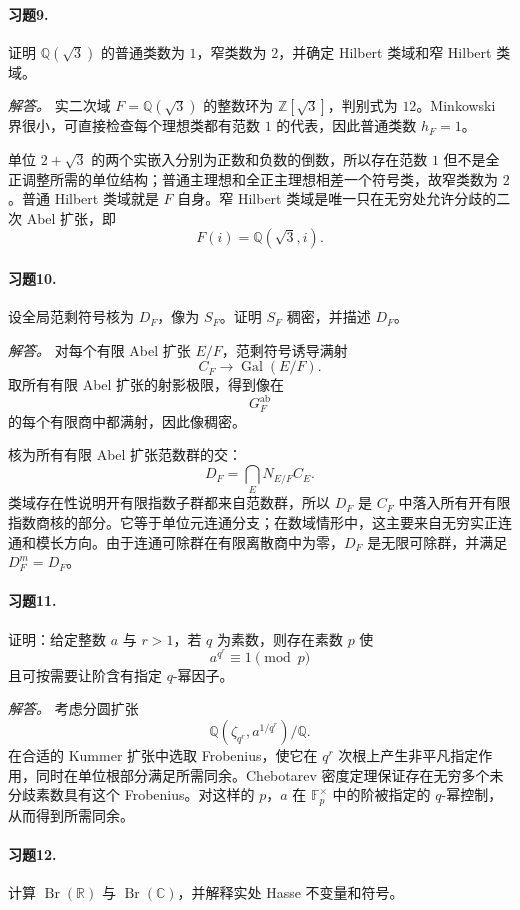 \documentclass[11pt,a4paper,openany]{ctexbook}
\numberwithin{equation}{chapter}
\newcommand{\Q}{\mathbb{Q}}
\newcommand{\R}{\mathbb{R}}
\newcommand{\C}{\mathbb{C}}
\newcommand{\Z}{\mathbb{Z}}
\newcommand{\F}{\mathbb{F}}
\newcommand{\Gal}{\operatorname{Gal}}
\newcommand{\Br}{\operatorname{Br}}
\theoremstyle{plain}
\theoremstyle{definition}
\theoremstyle{remark}
\begin{document}
\paragraph{习题9.}
证明 $\Q(\sqrt3)$ 的普通类数为 $1$，窄类数为 $2$，并确定 Hilbert 类域和窄 Hilbert 类域。

\emph{解答。}
实二次域 $F=\Q(\sqrt3)$ 的整数环为 $\Z[\sqrt3]$，判别式为 $12$。Minkowski 界很小，可直接检查每个理想类都有范数 $1$ 的代表，因此普通类数 $h_F=1$。

单位 $2+\sqrt3$ 的两个实嵌入分别为正数和负数的倒数，所以存在范数 $1$ 但不是全正调整所需的单位结构；普通主理想和全正主理想相差一个符号类，故窄类数为 $2$。普通 Hilbert 类域就是 $F$ 自身。窄 Hilbert 类域是唯一只在无穷处允许分歧的二次 Abel 扩张，即
\[
F(i)=\Q(\sqrt3,i).
\]

\paragraph{习题10.}
设全局范剩符号核为 $D_F$，像为 $S_F$。证明 $S_F$ 稠密，并描述 $D_F$。

\emph{解答。}
对每个有限 Abel 扩张 $E/F$，范剩符号诱导满射
\[
C_F\to\Gal(E/F).
\]
取所有有限 Abel 扩张的射影极限，得到像在
\[
G_F^{\operatorname{ab}}
\]
的每个有限商中都满射，因此像稠密。

核为所有有限 Abel 扩张范数群的交：
\[
D_F=\bigcap_E N_{E/F}C_E.
\]
类域存在性说明开有限指数子群都来自范数群，所以 $D_F$ 是 $C_F$ 中落入所有开有限指数商核的部分。它等于单位元连通分支；在数域情形中，这主要来自无穷实正连通和模长方向。由于连通可除群在有限离散商中为零，$D_F$ 是无限可除群，并满足 $D_F^m=D_F$。

\paragraph{习题11.}
证明：给定整数 $a$ 与 $r>1$，若 $q$ 为素数，则存在素数 $p$ 使
\[
a^{q^r}\equiv1\pmod p
\]
且可按需要让阶含有指定 $q$-幂因子。

\emph{解答。}
考虑分圆扩张
\[
\Q(\zeta_{q^r},a^{1/q^r})/\Q.
\]
在合适的 Kummer 扩张中选取 Frobenius，使它在 $q^r$ 次根上产生非平凡指定作用，同时在单位根部分满足所需同余。Chebotarev 密度定理保证存在无穷多个未分歧素数具有这个 Frobenius。对这样的 $p$，$a$ 在 $\F_p^\times$ 中的阶被指定的 $q$-幂控制，从而得到所需同余。

\paragraph{习题12.}
计算 $\Br(\R)$ 与 $\Br(\C)$，并解释实处 Hasse 不变量和符号。
\end{document}
